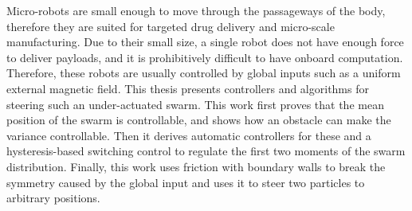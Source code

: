 


Micro-robots are small enough to move through the passageways of the body, therefore they are suited for targeted drug delivery and micro-scale manufacturing. Due to their small size, a single robot does not have enough force to deliver payloads, and it is prohibitively difficult to have onboard computation. Therefore, these robots are usually controlled by global inputs such as a uniform external magnetic field. This thesis presents controllers and algorithms for steering such an under-actuated swarm. This work first proves that the mean position of the swarm is controllable, and shows how an obstacle can make the variance controllable. Then it derives automatic controllers for these and a hysteresis-based switching control to regulate the first two moments of the swarm distribution. Finally, this work uses friction with boundary walls to break the symmetry caused by the global input and uses it to steer two particles to arbitrary positions. 
